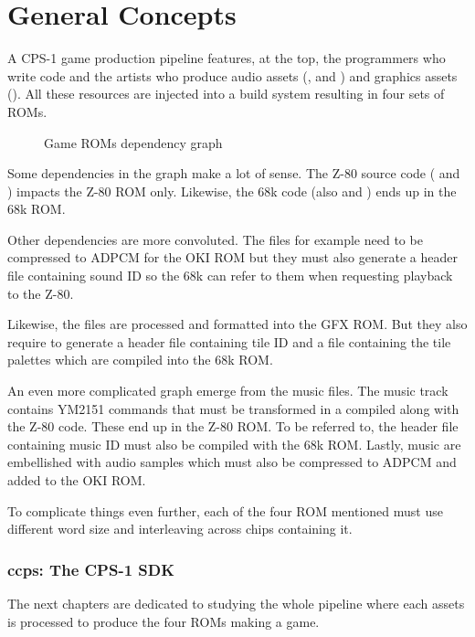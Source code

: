\chapter{General Concepts}

A CPS-1 game production pipeline features, at the top, the programmers who write code and the artists who produce audio assets (, and ) and graphics assets (). All these resources are injected into a build system resulting in four sets of ROMs. 

 \begin{figure}[H]
\caption*{Game ROMs dependency graph}
\end{figure}

Some dependencies in the graph make a lot of sense. The Z-80 source code ( and ) impacts the Z-80 ROM only. Likewise, the 68k code (also  and ) ends up in the 68k ROM.

Other dependencies are more convoluted. The  files for example need to be compressed to ADPCM for the OKI ROM but they must also generate a  header file containing sound ID so the 68k can refer to them when requesting playback to the Z-80.

Likewise, the  files are processed and formatted into the GFX ROM. But they also require to generate a  header file containing tile ID and a  file containing the tile palettes which are compiled into the 68k ROM. 

An even more complicated graph emerge from the music  files. The music track contains YM2151 commands that must be transformed in a  compiled along with the Z-80 code. These end up in the Z-80 ROM. To be referred to, the header file containing music ID must also be compiled with the 68k ROM. Lastly, music are embellished with audio samples which must also be compressed to ADPCM and added to the OKI ROM.

To complicate things even further, each of the four ROM mentioned must use different word size and interleaving across chips containing it.

\subsection{ccps: The CPS-1 SDK}
The next chapters are dedicated to studying the whole pipeline where each assets is processed to produce the four ROMs making a game. 

